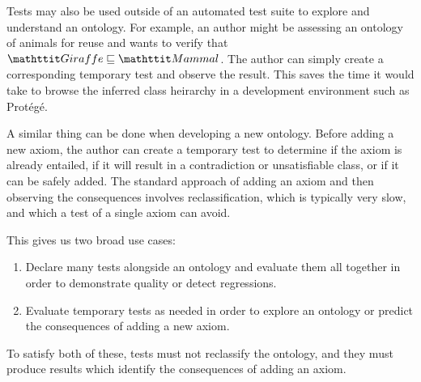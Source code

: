 \documentclass[paper.tex]{subfiles}
\begin{document}
Tests may also be used outside of an automated test suite to explore and understand an ontology.
For example, an author might be assessing an ontology of animals for reuse and wants to verify that $\oent{Giraffe} \sqsubseteq \oent{Mammal}$.
The author can simply create a corresponding temporary test and observe the result.
This saves the time it would take to browse the inferred class heirarchy in a development environment such as Prot\'eg\'e.

A similar thing can be done when developing a new ontology.
Before adding a new axiom, the author can create a temporary test to determine if the axiom is already entailed, if it will result in a contradiction or unsatisfiable class, or if it can be safely added.
The standard approach of adding an axiom and then observing the consequences involves reclassification, which is typically very slow, and which a test of a single axiom can avoid.

This gives us two broad use cases:
\begin{enumerate}[nosep]
  \item Declare many tests alongside an ontology and evaluate them all together in order to demonstrate quality or detect regressions.
  \item Evaluate temporary tests as needed in order to explore an ontology or predict the consequences of adding a new axiom.
\end{enumerate}

To satisfy both of these, tests must not reclassify the ontology, and they must produce results which identify the consequences of adding an axiom.
\end{document}
